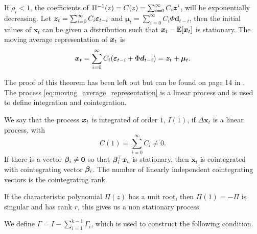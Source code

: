 \begin{thm}{\hfill}
    \noindent If $\rho_i<1$, the coefficients of $\Pi^{-1}(z)=C(z)=\sum_{i=0}^\infty C_i\boldsymbol{z}^i$, will be exponentially decreasing. Let $\boldsymbol{z}_t=\sum_{i=0}^\infty C_i\boldsymbol{\varepsilon}_{t-i}$ and $\boldsymbol{\mu}_t=\sum_{i=0}^\infty C_i\Phi \boldsymbol{d}_{t-i}$, then the initial values of $\boldsymbol{x}_t$ can be given a distribution such that $\boldsymbol{x}_t - \mathbb{E}[\boldsymbol{x}_t]$ is stationary. The moving average representation of $\boldsymbol{x}_t$ is 
    \begin{equation}
        \boldsymbol{x}_t=\sum_{i=0}^\infty C_i(\boldsymbol{\varepsilon}_{t-i}+\Phi \boldsymbol{d}_{t-i})=\boldsymbol{z}_t + \boldsymbol{\mu}_t.
        \label{eq:moving_average_representation}
    \end{equation}
\end{thm}
\noindent The proof of this theorem has been left out but can be found on page 14 in \cite{Likelihood-based-inference-book}.\\
\noindent The process \eqref{eq:moving_average_representation} is a linear process and is used to define integration and cointegration.
\begin{defi}{\hfill}
    We say that the process $\boldsymbol{x}_t$ is integrated of order $1$, $I(1)$, if $\Delta \boldsymbol{x}_t$ is a linear process, with 
    \begin{equation*}
        C(1) = \sum^\infty_{i=0} C_i \neq 0.
    \end{equation*}
    If there is a vector $\boldsymbol{\beta}_i \neq \boldsymbol{0}$ so that $\boldsymbol{\beta}_i^\top \boldsymbol{x}_t$ is stationary, then $\boldsymbol{x}_t$ is cointegrated with cointegrating vector $\boldsymbol{\beta}_i$. The number of linearly independent cointegrating vectors is the cointegrating rank.
\end{defi}

\noindent If the characteristic polynomial $\Pi(z)$ has a unit root, then $\Pi(1)=-\Pi$ is singular and has rank $r$, this gives us a non stationary process. 

\noindent
We define $\Gamma=I-\sum_{i=1}^{k-1}\Gamma_i$, which is used to construct the following condition.


